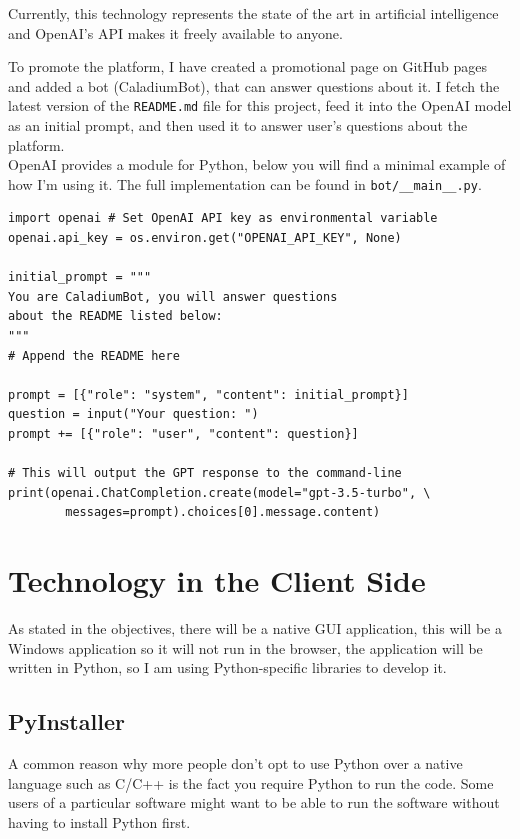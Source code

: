 Currently, this technology represents the state of the art in
artificial intelligence and
OpenAI's API makes it freely available to anyone.

To promote the platform, I have created a promotional page on
GitHub pages and added a bot (CaladiumBot),
that can answer questions about it.
I fetch the latest version of the \texttt{README.md} file for
this project, feed it into the OpenAI model as an initial prompt,
and then used it to answer user's questions about the platform. \\

OpenAI provides a module for Python,
below you will find a minimal example of how I'm using it.
The full implementation can be found in \texttt{bot/\_\_main\_\_.py}.

\begin{lstlisting}
import openai # Set OpenAI API key as environmental variable
openai.api_key = os.environ.get("OPENAI_API_KEY", None)

initial_prompt = """
You are CaladiumBot, you will answer questions
about the README listed below:
"""
# Append the README here

prompt = [{"role": "system", "content": initial_prompt}]
question = input("Your question: ")
prompt += [{"role": "user", "content": question}]

# This will output the GPT response to the command-line
print(openai.ChatCompletion.create(model="gpt-3.5-turbo", \
        messages=prompt).choices[0].message.content)
\end{lstlisting}

\section{Technology in the Client Side}
As stated in the objectives, there will be a native GUI application,
this will be a Windows application so it will not run in the browser,
the application will be written in Python,
so I am using Python-specific libraries to develop it.

\subsection{PyInstaller}
A common reason why more people don't opt to use Python over a
native language such as C/C++ is the fact you require Python
to run the code.
Some users of a particular software might
want to be able to run the software without having to install Python first. \\

